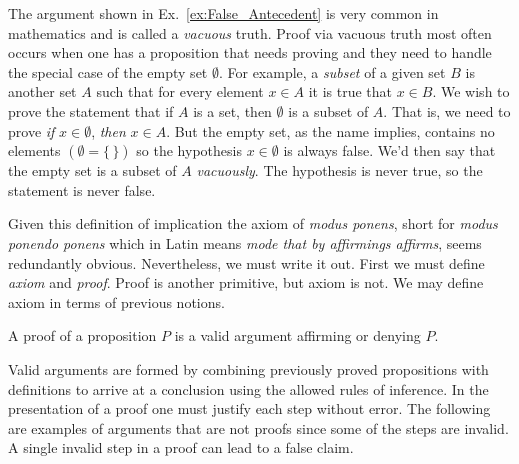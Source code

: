         \begin{example}
            \label{ex:Vacuous_Truth}%
            The argument shown in Ex.~\ref{ex:False_Antecedent} is very common
            in mathematics and is called a \textit{vacuous} truth.%
             Proof via vacuous truth
            most often occurs when one has a proposition that needs proving and
            they need to handle the special case of the empty set $\emptyset$.
            For example, a \textit{subset} of a
            given set $B$ is another set $A$
            such that for every element $x\in{A}$ it is true that $x\in{B}$. We
            wish to prove the statement that if $A$ is a set, then $\emptyset$
            is a subset of $A$. That is, we need to prove
            \textit{if} $x\in\emptyset$, \textit{then} $x\in{A}$. But the empty
            set, as the name implies, contains no elements $(\emptyset=\{\,\})$
            so the hypothesis $x\in\emptyset$ is always false. We'd then say
            that the empty set is a subset of $A$ \textit{vacuously}. The
            hypothesis is never true, so the statement is never false.
        \end{example}
        Given this definition of implication the axiom of \textit{modus ponens},
        short for \textit{modus ponendo ponens} which in Latin means
        \textit{mode that by affirmings affirms}, seems redundantly obvious.
        Nevertheless, we must write it out. First we must define
        \textit{axiom} and \textit{proof}. Proof is another primitive, but axiom
        is not. We may define axiom in terms of previous notions.
        \begin{definition}
            \label{def:Proof}%
            A \gls{proof} of a \gls{proposition} $P$ is a valid argument
            affirming or denying $P$.
        \end{definition}
        Valid arguments are formed by combining previously proved propositions
        with definitions to arrive at a conclusion using the allowed rules of
        inference. In the presentation of a proof one must justify each step
        without error. The following are examples of arguments that are not
        proofs since some of the steps are invalid. A single invalid step in a
        proof can lead to a false claim.
